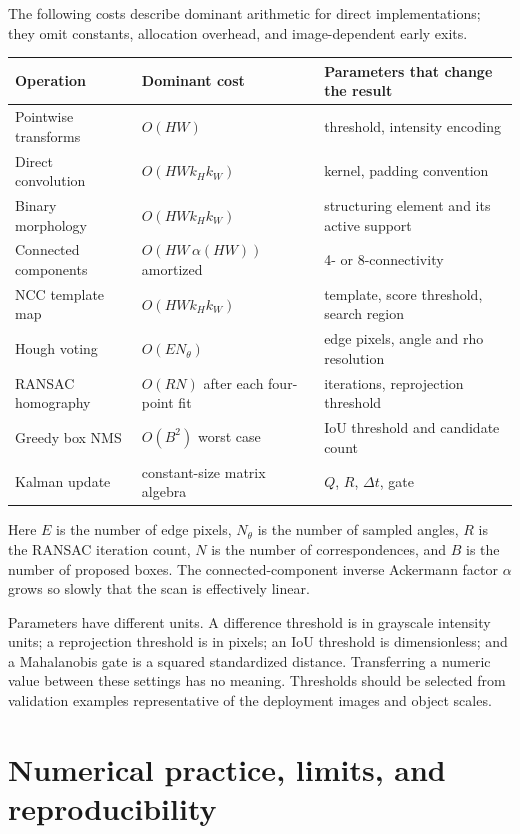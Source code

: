 \documentclass[11pt,a4paper]{article}
\newcommand{\1}{\mathbf{1}}
\begin{document}
The following costs describe dominant arithmetic for direct implementations;
they omit constants, allocation overhead, and image-dependent early exits.
\begin{center}
\begin{tabularx}{\textwidth}{@{}l l X@{}}
\toprule
Operation & Dominant cost & Parameters that change the result \\
\midrule
Pointwise transforms & $O(HW)$ & threshold, intensity encoding \\
Direct convolution & $O(HWk_Hk_W)$ & kernel, padding convention \\
Binary morphology & $O(HWk_Hk_W)$ & structuring element and its active support \\
Connected components & $O(HW\,\alpha(HW))$ amortized & 4- or 8-connectivity \\
NCC template map & $O(HWk_Hk_W)$ & template, score threshold, search region \\
Hough voting & $O(E N_\theta)$ & edge pixels, angle and rho resolution \\
RANSAC homography & $O(RN)$ after each four-point fit & iterations, reprojection threshold \\
Greedy box NMS & $O(B^2)$ worst case & IoU threshold and candidate count \\
Kalman update & constant-size matrix algebra & $Q$, $R$, $\Delta t$, gate \\
\bottomrule
\end{tabularx}
\end{center}
Here $E$ is the number of edge pixels, $N_\theta$ is the number of sampled
angles, $R$ is the RANSAC iteration count, $N$ is the number of correspondences,
and $B$ is the number of proposed boxes. The connected-component inverse
Ackermann factor $\alpha$ grows so slowly that the scan is effectively linear.

Parameters have different units. A difference threshold is in grayscale
intensity units; a reprojection threshold is in pixels; an IoU threshold is
dimensionless; and a Mahalanobis gate is a squared standardized distance.
Transferring a numeric value between these settings has no meaning. Thresholds
should be selected from validation examples representative of the deployment
images and object scales.

\section{Numerical practice, limits, and reproducibility}
\end{document}
